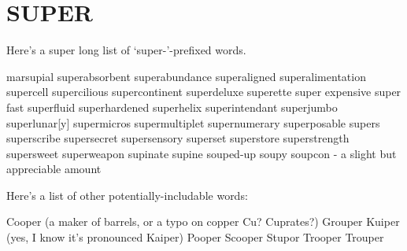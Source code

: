 \section{SUPER}
Here's a super long list of `super-'-prefixed words.

marsupial
superabsorbent
superabundance
superaligned
superalimentation
supercell
supercilious
supercontinent
superdeluxe
superette
super expensive
super fast
superfluid
superhardened
superhelix
superintendant
superjumbo
superlunar[y]
supermicros
supermultiplet
supernumerary
superposable
supers
superscribe
supersecret
supersensory
superset
superstore
superstrength
supersweet
superweapon
supinate
supine
souped-up
soupy
soupcon - a slight but appreciable amount

Here's a list of other potentially-includable words:

Cooper (a maker of barrels, or a typo on copper Cu?  Cuprates?)
Grouper
Kuiper (yes, I know it's pronounced Kaiper)
Pooper
Scooper
Stupor
Trooper
Trouper